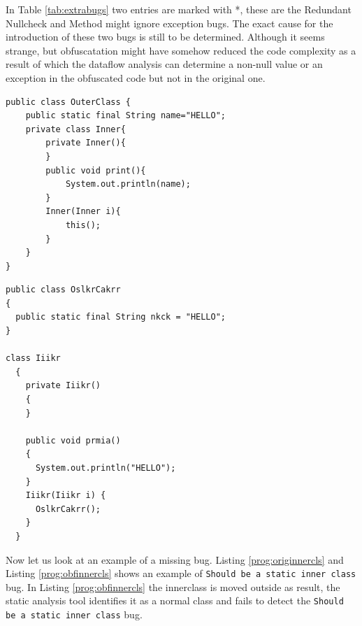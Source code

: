 \documentclass[twocolumn]{article}
\begin{document}
In Table \ref{tab:extrabugs} two entries are marked with *, these are the Redundant Nullcheck and Method might ignore exception bugs. The exact cause for the introduction of these two 
bugs is still to be determined. Although it seems strange, but obfuscatation might have somehow reduced the code complexity as a result of which the dataflow analysis can determine a 
non-null value or an exception in the obfuscated code but not in the original one.
\begin{tiny}\begin{lstlisting}[frame=single]
 public class OuterClass {
	public static final String name="HELLO";
	private class Inner{
		private Inner(){
		}
		public void print(){
			System.out.println(name);
		}
		Inner(Inner i){
			this();
		}
	}
}
\end{lstlisting}
\end{tiny}
{}
\begin{tiny}\begin{lstlisting}[frame=single]
 public class OslkrCakrr
{
  public static final String nkck = "HELLO";
}

class Iiikr
  {
    private Iiikr()
    {
    }

    public void prmia()
    {
      System.out.println("HELLO");
    }
    Iiikr(Iiikr i) {
      OslkrCakrr();
    }
  }
\end{lstlisting}
\end{tiny}
Now let us look at an example of a missing bug. Listing \ref{prog:originnercls} and Listing \ref{prog:obfinnercls} shows an example of {\tt Should be a static inner class} bug. In Listing 
\ref{prog:obfinnercls} the innerclass is moved outside as result, the static analysis tool identifies it as a normal class and fails to detect the {\tt Should be a static inner class} bug.
\end{document}
